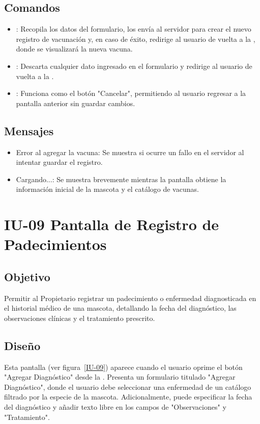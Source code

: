 \subsection{Comandos}
\begin{itemize}
    \item {}: Recopila los datos del formulario, los envía al servidor para crear el nuevo registro de vacunación y, en caso de éxito, redirige al usuario de vuelta a la , donde se visualizará la nueva vacuna.
    \item {}: Descarta cualquier dato ingresado en el formulario y redirige al usuario de vuelta a la .
    \item {}: Funciona como el botón "Cancelar", permitiendo al usuario regresar a la pantalla anterior sin guardar cambios.
\end{itemize}

\subsection{Mensajes}
\begin{itemize}
    \item Error al agregar la vacuna: Se muestra si ocurre un fallo en el servidor al intentar guardar el registro.
    \item Cargando...: Se muestra brevemente mientras la pantalla obtiene la información inicial de la mascota y el catálogo de vacunas.
\end{itemize}

\section{IU-09 Pantalla de Registro de Padecimientos}

\subsection{Objetivo}
    Permitir al Propietario registrar un padecimiento o enfermedad diagnosticada en el historial médico de una mascota, detallando la fecha del diagnóstico, las observaciones clínicas y el tratamiento prescrito.

\subsection{Diseño}
    Esta pantalla  (ver figura~\ref{IU-09}) aparece cuando el usuario oprime el botón "Agregar Diagnóstico" desde la . Presenta un formulario titulado "Agregar Diagnóstico", donde el usuario debe seleccionar una enfermedad de un catálogo filtrado por la especie de la mascota. Adicionalmente, puede especificar la fecha del diagnóstico y añadir texto libre en los campos de "Observaciones" y "Tratamiento".

